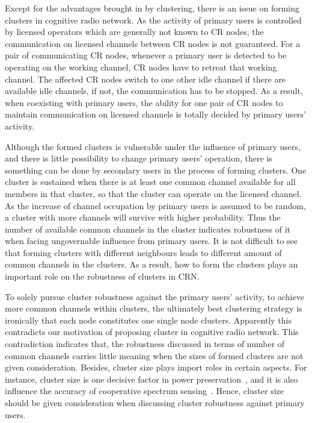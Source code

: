 Except for the advantages brought in by clustering, there is an issue on forming clusters in cognitive radio network.
As the activity of primary users is controlled by licensed operators which are generally not known to CR nodes, the communication on licensed channels between CR nodes is not guaranteed. 
For a pair of communicating CR nodes, whenever a primary user is detected to be operating on the working channel, CR nodes have to retreat that working channel.
The affected CR nodes switch to one other idle channel if there are available idle channels, if not, the communication has to be stopped.
As a result, when coexisting with primary users, the ability for one pair of CR nodes to maintain communication on licensed channels is totally decided by primary users' activity.

Although the formed clusters is vulnerable under the influence of primary users, and there is little possibility to change primary users' operation, there is something can be done by secondary users in the process of forming clusters. 
One cluster is sustained when there is at least one common channel available for all members in that cluster, so that the cluster can operate on the licensed channel.
As the increase of channel occupation by primary users is assumed to be random, a cluster with more channels will survive with higher probability.
Thus the number of available common channels in the cluster indicates robustness of it when facing ungovernable influence from primary users.
It is not difficult to see that forming clusters with different neighbours leads to different amount of common channels in the clusters.
As a result, how to form the clusters plays an important role on the robustness of clusters in CRN.


To solely pursue cluster robustness against the primary users' activity, \ie to achieve more common channels within clusters, the ultimately best clustering strategy is ironically that each node constitutes one single node clusters.
Apparently this contradicts our motivation of proposing cluster in cognitive radio network.
This contradiction indicates that, the robustness discussed in terms of number of common channels carries little meaning when the sizes of formed clusters are not given consideration.
Besides, cluster size plays import roles in certain aspects.
For instance, cluster size is one decisive factor in power preservation~\cite{clustering_globecom11, EnergyEfficientClusteringRouting_2015}, and it is also influence the accuracy of cooperative spectrum sensing~\cite{Consensus_based_clustering12}.
Hence, cluster size should be given consideration when discussing cluster robustness against primary users.

